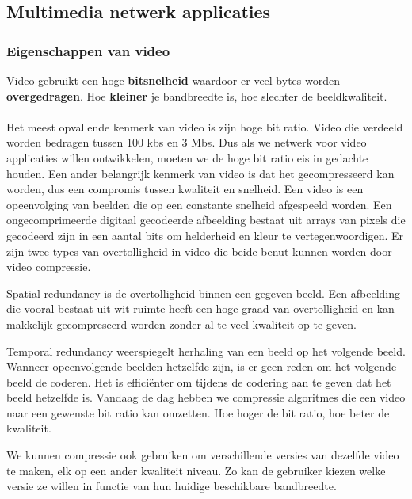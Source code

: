 \subsection{Multimedia netwerk applicaties}

\subsubsection{Eigenschappen van video}

\noindent Video gebruikt een hoge \textbf{bitsnelheid} waardoor er veel bytes worden \textbf{overgedragen}. Hoe \textbf{kleiner} je bandbreedte is, hoe slechter de beeldkwaliteit.\\\\

\noindent Het meest opvallende kenmerk van video is zijn hoge bit ratio. Video die verdeeld worden bedragen tussen 100 kbs en 3 Mbs. Dus als we netwerk voor video applicaties willen ontwikkelen, moeten we de hoge bit ratio eis in gedachte houden. Een ander belangrijk kenmerk van video is dat het gecompresseerd kan worden, dus een compromis tussen kwaliteit en snelheid. Een video is een opeenvolging van beelden die op een constante snelheid afgespeeld worden. Een ongecomprimeerde digitaal gecodeerde afbeelding bestaat uit arrays van pixels die gecodeerd zijn in een aantal bits om helderheid en kleur te vertegenwoordigen. Er zijn twee types van overtolligheid in video die beide benut kunnen worden door video compressie.

\noindent Spatial redundancy is de overtolligheid binnen een gegeven beeld. Een afbeelding die vooral bestaat uit wit ruimte heeft een hoge graad van overtolligheid en kan makkelijk gecompreseerd worden zonder al te veel kwaliteit op te geven.

\noindent Temporal redundancy weerspiegelt herhaling van een beeld op het volgende beeld. Wanneer opeenvolgende beelden hetzelfde zijn, is er geen reden om het volgende beeld de coderen. Het is efficiënter om tijdens de codering aan te geven dat het beeld hetzelfde is.
Vandaag de dag hebben we compressie algoritmes die een video naar een gewenste bit ratio kan omzetten. Hoe hoger de bit ratio, hoe beter de kwaliteit.

We kunnen compressie ook gebruiken om verschillende versies van dezelfde video te maken, elk op een ander kwaliteit niveau. Zo kan de gebruiker kiezen welke versie ze willen in functie van hun huidige beschikbare bandbreedte.

\clearpage

